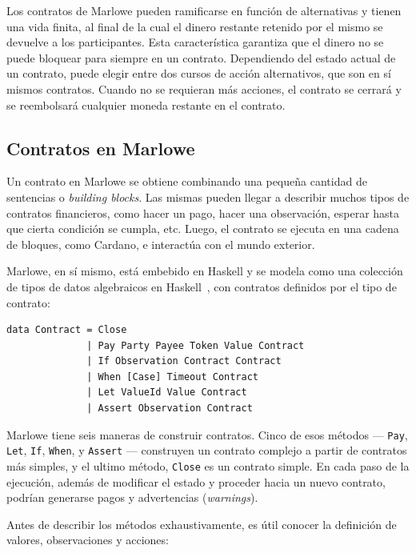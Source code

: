 \documentclass[12pt]{book}
\begin{document}
Los contratos de Marlowe pueden ramificarse en función de alternativas y tienen una vida finita, al final de la cual el dinero restante retenido por el mismo se devuelve a los participantes. Esta característica garantiza que el dinero no se puede bloquear para siempre en un contrato. Dependiendo del estado actual de un contrato, puede elegir entre dos cursos de acción alternativos, que son en sí mismos contratos. Cuando no se requieran más acciones, el contrato se cerrará y se reembolsará cualquier moneda restante en el contrato.

\subsection{Contratos en Marlowe}
Un contrato en Marlowe se obtiene combinando una pequeña cantidad de sentencias o \textit{building blocks}. Las mismas pueden llegar a describir muchos tipos de contratos financieros, como hacer un pago, hacer una observación, esperar hasta que cierta condición se cumpla, etc. Luego, el contrato se ejecuta en una cadena de bloques, como Cardano, e interactúa con el mundo exterior.

Marlowe, en sí mismo, está embebido en Haskell y se modela como una colección de tipos de datos algebraicos en Haskell~\cite{Algebraic_data_type}, con contratos definidos por el tipo de contrato:

\begin{lstlisting}[language=Marlowe]
data Contract = Close
              | Pay Party Payee Token Value Contract
              | If Observation Contract Contract
              | When [Case] Timeout Contract
              | Let ValueId Value Contract
              | Assert Observation Contract
\end{lstlisting}

Marlowe tiene seis maneras de construir contratos. Cinco de esos métodos ---
\texttt{Pay}, \texttt{Let}, \texttt{If}, \texttt{When}, y \texttt{Assert} --- construyen un contrato complejo a partir de contratos más simples, y el ultimo método, \texttt{Close} es un contrato simple. En cada paso de la ejecución, además de modificar el estado y proceder hacia un nuevo contrato, podrían generarse pagos y advertencias (\textit{warnings}).

Antes de describir los métodos exhaustivamente, es útil conocer la definición de valores, observaciones y acciones:
\end{document}
